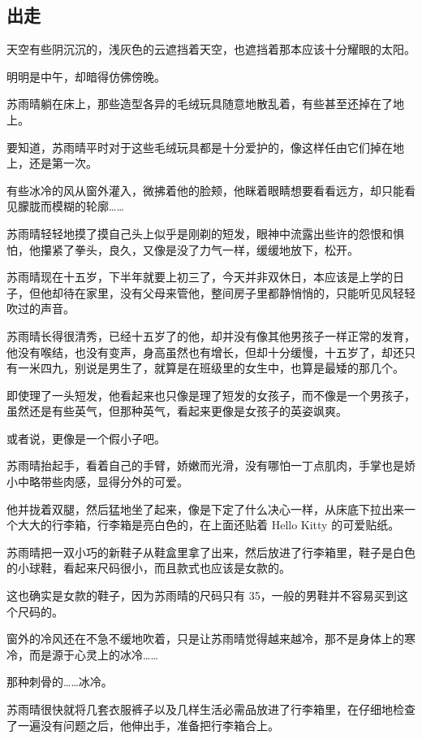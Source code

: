 \subsection{出走}

天空有些阴沉沉的，浅灰色的云遮挡着天空，也遮挡着那本应该十分耀眼的太阳。

明明是中午，却暗得仿佛傍晚。

苏雨晴躺在床上，那些造型各异的毛绒玩具随意地散乱着，有些甚至还掉在了地上。

要知道，苏雨晴平时对于这些毛绒玩具都是十分爱护的，像这样任由它们掉在地上，还是第一次。

有些冰冷的风从窗外灌入，微拂着他的脸颊，他眯着眼睛想要看看远方，却只能看见朦胧而模糊的轮廓……

苏雨晴轻轻地摸了摸自己头上似乎是刚剃的短发，眼神中流露出些许的怨恨和惧怕，他攥紧了拳头，良久，又像是没了力气一样，缓缓地放下，松开。

苏雨晴现在十五岁，下半年就要上初三了，今天并非双休日，本应该是上学的日子，但他却待在家里，没有父母来管他，整间房子里都静悄悄的，只能听见风轻轻吹过的声音。

苏雨晴长得很清秀，已经十五岁了的他，却并没有像其他男孩子一样正常的发育，他没有喉结，也没有变声，身高虽然也有增长，但却十分缓慢，十五岁了，却还只有一米四九，别说是男生了，就算是在班级里的女生中，也算是最矮的那几个。

即使理了一头短发，他看起来也只像是理了短发的女孩子，而不像是一个男孩子，虽然还是有些英气，但那种英气，看起来更像是女孩子的英姿飒爽。

或者说，更像是一个假小子吧。

苏雨晴抬起手，看着自己的手臂，娇嫩而光滑，没有哪怕一丁点肌肉，手掌也是娇小中略带些肉感，显得分外的可爱。

他并拢着双腿，然后猛地坐了起来，像是下定了什么决心一样，从床底下拉出来一个大大的行李箱，行李箱是亮白色的，在上面还贴着 Hello Kitty 的可爱贴纸。

苏雨晴把一双小巧的新鞋子从鞋盒里拿了出来，然后放进了行李箱里，鞋子是白色的小球鞋，看起来尺码很小，而且款式也应该是女款的。

这也确实是女款的鞋子，因为苏雨晴的尺码只有 35，一般的男鞋并不容易买到这个尺码的。

窗外的冷风还在不急不缓地吹着，只是让苏雨晴觉得越来越冷，那不是身体上的寒冷，而是源于心灵上的冰冷……

那种刺骨的……冰冷。

苏雨晴很快就将几套衣服裤子以及几样生活必需品放进了行李箱里，在仔细地检查了一遍没有问题之后，他伸出手，准备把行李箱合上。

